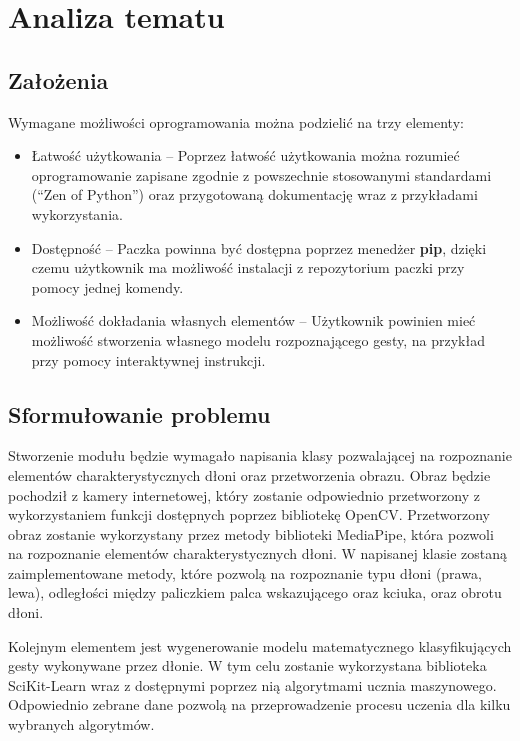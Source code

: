 \chapter{Analiza tematu}

\section{Założenia}

\quad Wymagane możliwości oprogramowania można podzielić na trzy elementy:

\begin{itemize}
    \item Łatwość użytkowania -- Poprzez łatwość użytkowania można rozumieć oprogramowanie zapisane zgodnie z powszechnie stosowanymi standardami (\enquote{Zen of Python}) oraz przygotowaną dokumentację wraz z przykładami wykorzystania. 
    \item Dostępność -- Paczka powinna być dostępna poprzez menedżer \textbf{pip}, dzięki czemu użytkownik ma możliwość instalacji z repozytorium paczki przy pomocy jednej komendy.
    \item Możliwość dokładania własnych elementów -- Użytkownik powinien mieć możliwość stworzenia własnego modelu rozpoznającego gesty, na przykład przy pomocy interaktywnej instrukcji.
\end{itemize}


\section {Sformułowanie problemu}

\quad Stworzenie modułu będzie wymagało napisania klasy pozwalającej na rozpoznanie elementów charakterystycznych dłoni oraz przetworzenia obrazu. Obraz będzie pochodził z kamery internetowej, który zostanie odpowiednio przetworzony z wykorzystaniem funkcji dostępnych poprzez bibliotekę OpenCV. Przetworzony obraz zostanie wykorzystany przez metody biblioteki MediaPipe, która pozwoli na rozpoznanie elementów charakterystycznych dłoni. W napisanej klasie zostaną zaimplementowane metody, które pozwolą na rozpoznanie typu dłoni (prawa, lewa), odległości między paliczkiem palca wskazującego oraz kciuka, oraz obrotu dłoni. 

\quad Kolejnym elementem jest wygenerowanie modelu matematycznego klasyfikujących gesty wykonywane przez dłonie. W tym celu zostanie wykorzystana biblioteka SciKit-Learn wraz z dostępnymi poprzez nią algorytmami ucznia maszynowego. Odpowiednio zebrane dane pozwolą na przeprowadzenie procesu uczenia dla kilku wybranych algorytmów. 
